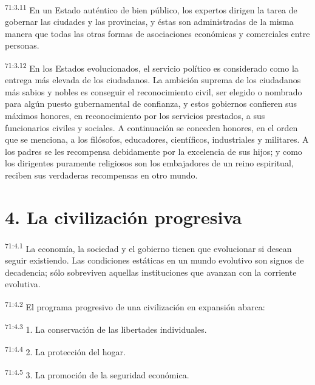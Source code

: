 \documentclass[twoside, 11pt]{book}
\begin{document}
\par
\textsuperscript{71:3.11} En un Estado auténtico de bien público, los expertos dirigen la tarea de gobernar las ciudades y las provincias, y éstas son administradas de la misma manera que todas las otras formas de asociaciones económicas y comerciales entre personas.

\par
\textsuperscript{71:3.12} En los Estados evolucionados, el servicio político es considerado como la entrega más elevada de los ciudadanos. La ambición suprema de los ciudadanos más sabios y nobles es conseguir el reconocimiento civil, ser elegido o nombrado para algún puesto gubernamental de confianza, y estos gobiernos confieren sus máximos honores, en reconocimiento por los servicios prestados, a sus funcionarios civiles y sociales. A continuación se conceden honores, en el orden que se menciona, a los filósofos, educadores, científicos, industriales y militares. A los padres se les recompensa debidamente por la excelencia de sus hijos; y como los dirigentes puramente religiosos son los embajadores de un reino espiritual, reciben sus verdaderas recompensas en otro mundo.

\section*{4. La civilización progresiva}
\par
\textsuperscript{71:4.1} La economía, la sociedad y el gobierno tienen que evolucionar si desean seguir existiendo. Las condiciones estáticas en un mundo evolutivo son signos de decadencia; sólo sobreviven aquellas instituciones que avanzan con la corriente evolutiva.

\par
\textsuperscript{71:4.2} El programa progresivo de una civilización en expansión abarca:

\par
\textsuperscript{71:4.3} 1. La conservación de las libertades individuales.

\par
\textsuperscript{71:4.4} 2. La protección del hogar.

\par
\textsuperscript{71:4.5} 3. La promoción de la seguridad económica.
\end{document}
